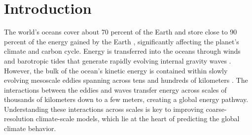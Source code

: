 \documentclass[../Rajarshi-thesis-draft.tex]{subfiles}
\begin{document}

\section{Introduction}


The world's oceans cover about 70 percent of the Earth and store close to 90 percent of the energy gained by the Earth \citep{von2023}, significantly affecting the planet's climate and carbon cycle. Energy is transferred into the oceans through winds and barotropic tides that generate rapidly evolving internal gravity waves \citep{Garrett_Munk_1972, Munk_Wunsch_1998, FerrariWunsch09}. However, the bulk of the ocean's kinetic energy is contained within slowly evolving mesoscale eddies spanning across tens and hundreds of kilometers \citep{WF04, Chelton_etal_2007, FerrariWunsch09, Chelton11}. The interactions between the eddies and waves transfer energy across scales of thousands of kilometers down to a few meters, creating a global energy pathway. Understanding these interactions across scales is key to improving coarse-resolution climate-scale models, which lie at the heart of predicting the global climate behavior.
\end{document}
